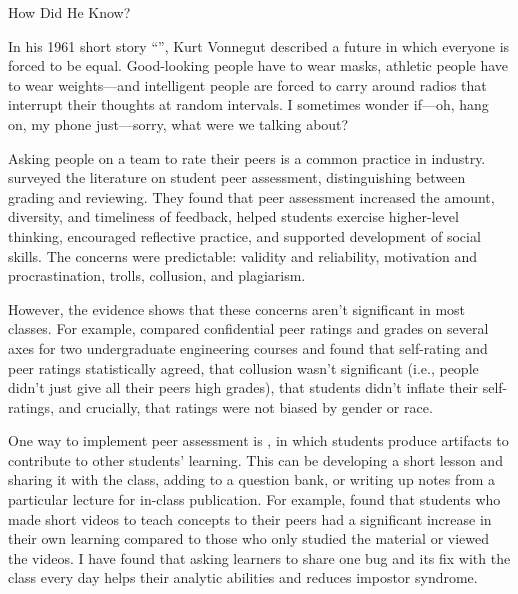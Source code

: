 \begin{aside}{How Did He Know?}

  In his 1961 short story ``'',
  Kurt Vonnegut described a future in which everyone is forced to be equal.
  Good-looking people have to wear masks,
  athletic people have to wear weights---and intelligent people
  are forced to carry around radios that interrupt their thoughts at random intervals.
  I sometimes wonder if---oh, hang on, my phone just---sorry, what were we talking about?

\end{aside}


Asking people on a team to rate their peers is a common practice in industry.
\cite{Sond2012} surveyed the literature on student peer assessment,
distinguishing between grading and reviewing.
They found that peer assessment increased the amount, diversity, and timeliness of feedback,
helped students exercise higher-level thinking,
encouraged reflective practice,
and supported development of social skills.
The concerns were predictable:
validity and reliability,
motivation and procrastination,
trolls, collusion, and plagiarism.

However,
the evidence shows that these concerns aren't significant in most classes.
For example,
\cite{Kauf2000} compared confidential peer ratings and grades on several axes
for two undergraduate engineering courses
and found that self-rating and peer ratings statistically agreed,
that collusion wasn't significant (i.e., people didn't just give all their peers high grades),
that students didn't inflate their self-ratings,
and crucially,
that ratings were not biased by gender or race.

One way to implement peer assessment is ,
in which students produce artifacts to contribute to other students' learning.
This can be developing a short lesson and sharing it with the class,
adding to a question bank,
or writing up notes from a particular lecture for in-class publication.
For example,
\cite{Fran2018} found that students who made short videos to teach concepts to their peers
had a significant increase in their own learning
compared to those who only studied the material or viewed the videos.
I have found that asking learners to share one bug and its fix with the class every day
helps their analytic abilities and reduces impostor syndrome.

